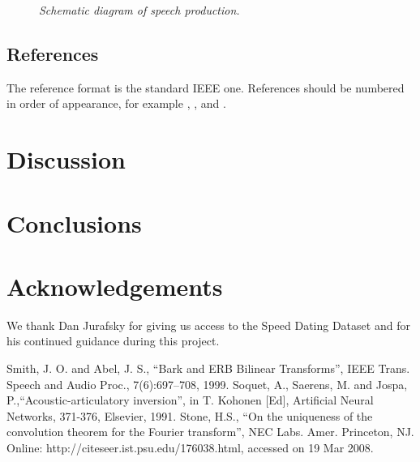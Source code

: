 \documentclass[a4paper]{article}
\begin{document}
\begin{figure}[t]
\centerline{}
\caption{{\it Schematic diagram of speech production.}}  
\label{spprod}
\end{figure}

\subsection{References}

The reference format is the standard IEEE one.
References should be numbered in order of appearance, 
for example \cite{ES1}, \cite{ES2}, and \cite{ES3}. 

\section{Discussion}


\section{Conclusions}


\section{Acknowledgements}
We thank Dan Jurafsky for giving us access to the Speed Dating Dataset and for his continued guidance during this project.

\newpage
%
\eightpt

\begin{thebibliography}{10}
 Smith, J. O. and Abel, J. S., 
``Bark and {ERB} Bilinear Transforms'', 
IEEE Trans. Speech and Audio Proc., 7(6):697--708, 1999.  
 Soquet, A., Saerens, M. and Jospa, P.,``Acoustic-articulatory
inversion'', in T. Kohonen [Ed], Artificial Neural Networks, 371-376,
Elsevier, 1991.
 Stone, H.S., ``On the uniqueness of the convolution theorem
for the Fourier transform'', NEC Labs. Amer. Princeton, NJ. 
Online: http://citeseer.ist.psu.edu/176038.html, accessed on 19 Mar 2008.
\end{thebibliography}
\end{document}
